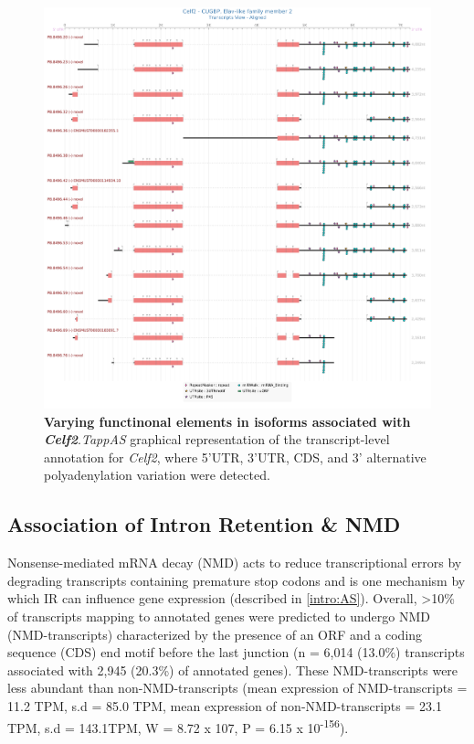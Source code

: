 \begin{figure}[!htp]
	\centering
	\includegraphics[scale = 0.3]{Figures/tappAS_Celf2.png}
	\captionsetup{width=0.95\textwidth}
	\caption[Varying functinonal elements in isoforms associated with \textit{Celf2}]%
	{\textbf{Varying functinonal elements in isoforms associated with \textit{Celf2}}.\textit{TappAS} graphical representation of the transcript-level annotation for \textit{Celf2}, where 5'UTR, 3'UTR, CDS, and 3' alternative polyadenylation variation were detected.}   
	\label{fig:Celf}
\end{figure}	


\subsection{Association of Intron Retention \& NMD}
Nonsense-mediated mRNA decay (NMD) acts to reduce transcriptional errors by degrading transcripts containing premature stop codons\cite{Hug2015} and is one mechanism by which IR can influence gene expression\cite{Pan2006} (described in \cref{intro:AS}). Overall, >10\% of transcripts mapping to annotated genes were predicted to undergo NMD (NMD-transcripts) characterized by the presence of an ORF and a coding sequence (CDS) end motif before the last junction (n = 6,014 (13.0\%) transcripts associated with 2,945 (20.3\%) of annotated genes). These NMD-transcripts were less abundant than non-NMD-transcripts (mean expression of NMD-transcripts = 11.2 TPM, s.d =  85.0 TPM, mean expression of non-NMD-transcripts = 23.1 TPM, s.d = 143.1TPM, W = 8.72 x 107, P = 6.15 x 10\textsuperscript{-156}).  

